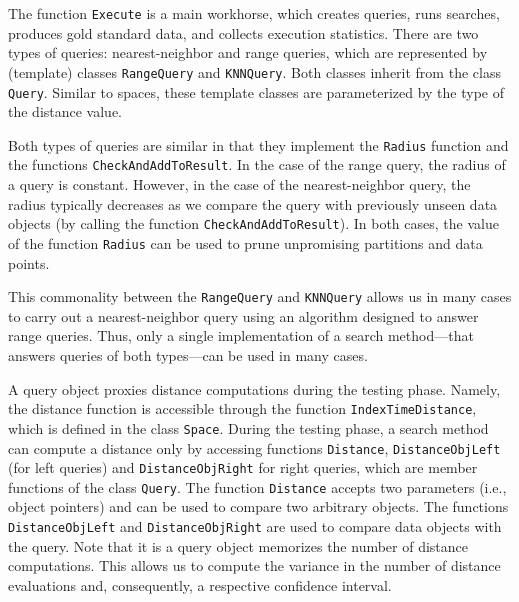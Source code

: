 \documentclass[runningheads,a4paper]{llncs}
\newcommand{\ttt}[1]{\texttt{#1}}
\begin{document}
The function \ttt{Execute} is a main workhorse, which creates queries, runs searches,
produces gold standard data, and collects execution statistics.
There are two types of queries: nearest-neighbor and range queries,
which are represented by (template) classes \ttt{RangeQuery} and \ttt{KNNQuery}.
Both classes inherit from the class \ttt{Query}.
Similar to spaces, these template classes are parameterized by the type of the distance value.

Both types of queries are similar in that they implement the \ttt{Radius} function
and the functions \ttt{CheckAndAddToResult}. 
In the case of the range query, the radius of a query is constant.
However, in the case of the nearest-neighbor query,
the radius typically decreases as we compare the query
with previously unseen data objects (by calling the function \ttt{CheckAndAddToResult}).
In both cases, the value of the function \ttt{Radius} can be used to prune unpromising
partitions and data points.

This commonality between the \ttt{RangeQuery} and \ttt{KNNQuery}
allows us in many cases to carry out a nearest-neighbor query 
using an algorithm designed to answer range queries.
Thus, only a single implementation of a search method---that answers queries of both types---can be used in many cases.

A query object proxies distance computations during the testing phase.
Namely, the distance function is accessible through the function
\ttt{IndexTimeDistance}, which is defined in the class \ttt{Space}.
During the testing phase, a search method can compute a distance
only by accessing functions \ttt{Distance}, 
\ttt{DistanceObjLeft} (for left queries) and 
\ttt{DistanceObjRight} for right queries,
which are member functions of the class \ttt{Query}.
The function \ttt{Distance} accepts two parameters (i.e., object pointers) and 
can be used to compare two arbitrary objects.
The functions \ttt{DistanceObjLeft} and \ttt{DistanceObjRight} are used 
to compare data objects with the query.
Note that it is a query object  memorizes the number of distance computations.
This allows us to compute the variance in the number of distance evaluations
and, consequently, a respective confidence interval.
\end{document}
